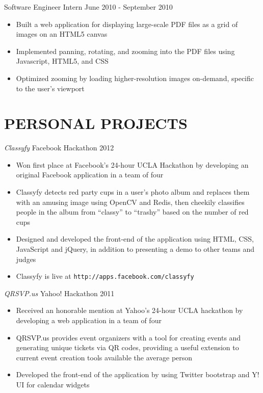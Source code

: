 \documentclass{res}
\begin{document}
\begin{resume}
 Software Engineer Intern \hfill    June 2010 - September 2010

   \begin{itemize} \itemsep -2pt
   \item Built a web application for displaying large-scale PDF files as a grid of images on an HTML5 canvas
   \item Implemented panning, rotating, and zooming into the PDF files using Javascript, HTML5, and CSS
	\item Optimized zooming by loading higher-resolution images on-demand, specific to the user's viewport
   \end{itemize} \vspace{-6pt}

\section{PERSONAL PROJECTS}
\vspace{8pt}

 {\sl Classyfy} \hfill Facebook Hackathon 2012
   \begin{itemize} \itemsep -2pt
   \item{Won first place at Facebook's 24-hour UCLA Hackathon by developing an original Facebook application in a team of four}
   \item Classyfy detects red party cups in a user's photo album and replaces them with an amusing image using OpenCV and Redis, then cheekily classifies people in the album from ``classy'' to ``trashy'' based on the number of red cups
    \item Designed and developed the front-end of the application using HTML, CSS, JavaScript and jQuery, in addition to presenting a demo to other teams and judges
	\item{Classyfy is live at \tt{http://apps.facebook.com/classyfy}}
    \end{itemize} \vspace{-6pt}

 {\sl QRSVP.us} \hfill Yahoo! Hackathon 2011
  \begin{itemize} \itemsep -2pt
  \item Received an honorable mention at Yahoo's 24-hour UCLA hackathon by developing a web application in a team of four
  \item QRSVP.us provides event organizers with a tool for creating events and generating unique tickets via QR codes, providing a useful extension to current event creation tools available the average person
  \item Developed the front-end of the application by using Twitter bootstrap and Y! UI for calendar widgets
  \end{itemize} \vspace{-6pt}


\end{resume}
\end{document}

